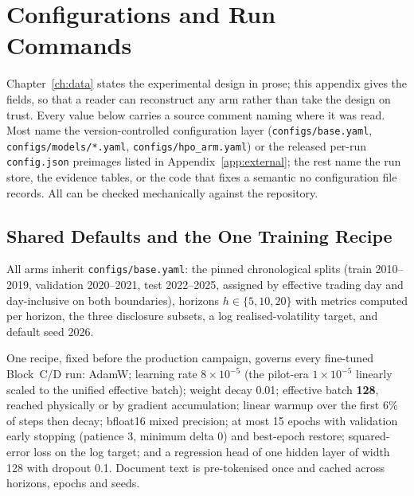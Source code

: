 \chapter{Configurations and Run Commands}
\label{app:hyperparams}


Chapter~\ref{ch:data} states the experimental design in prose; this appendix gives
the fields, so that a reader can reconstruct any arm rather than take the design
on trust. Every value below carries a source comment naming where it was
read. Most name the version-controlled configuration layer
(\texttt{configs/base.yaml}, \texttt{configs/models/*.yaml},
\texttt{configs/hpo\_arm.yaml}) or the released per-run \texttt{config.json}
preimages listed in Appendix~\ref{app:external}; the rest name the run store,
the evidence tables, or the code that fixes a semantic no configuration file
records. All can be checked mechanically against the repository. %

\FloatBarrier
\section{Shared Defaults and the One Training Recipe}
\label{app:hyperparams:recipe}

All arms inherit \texttt{configs/base.yaml}: the pinned chronological splits
(train 2010--2019, validation 2020--2021, test 2022--2025, assigned by effective
trading day and day-inclusive on both boundaries), horizons $h \in \{5,10,20\}$
with metrics computed per horizon, the three disclosure subsets, a log
realised-volatility target, and default seed 2026.

One recipe, fixed before the production campaign, governs every fine-tuned
Block~C/D run: AdamW; learning rate $8\times10^{-5}$ (the pilot-era
$1\times10^{-5}$ linearly scaled to the unified effective batch); weight decay
0.01; effective batch \textbf{128}, reached physically or by gradient
accumulation; linear warmup over the first 6\% of steps then decay; bfloat16
mixed precision; at most 15 epochs with validation early stopping (patience 3,
minimum delta 0) and best-epoch restore; squared-error loss on the log target;
and a regression head of one hidden layer of width 128 with dropout 0.1. %
Document text is pre-tokenised once and cached across horizons, epochs and seeds.

